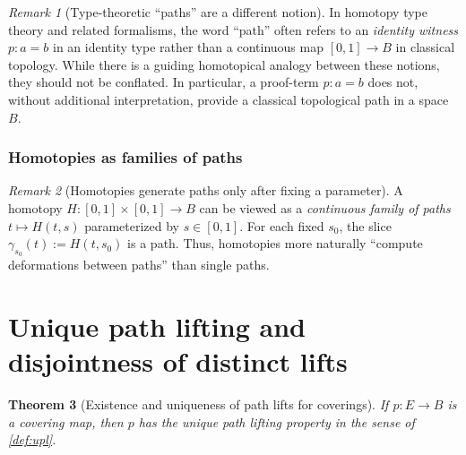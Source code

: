 \documentclass[11pt,a4paper]{article}
\newtheorem{theorem}{Theorem}[section]
\theoremstyle{definition}
\theoremstyle{remark}
\newtheorem{remark}[theorem]{Remark}
\begin{document}
\begin{remark}[Type-theoretic ``paths'' are a different notion]
\label{rem:tt-paths}
In homotopy type theory and related formalisms, the word ``path'' often refers to an \emph{identity witness} \(p:a=b\) in an identity type rather than a continuous map \([0,1]\to B\) in classical topology. While there is a guiding homotopical analogy between these notions, they should not be conflated. In particular, a proof-term \(p:a=b\) does not, without additional interpretation, provide a classical topological path in a space \(B\).
\end{remark}

\subsubsection{Homotopies as families of paths}
\label{sec:homotopies-as-families}

\begin{remark}[Homotopies generate paths only after fixing a parameter]
\label{rem:homotopy-slice}
A homotopy \(H:[0,1]\times[0,1]\to B\) can be viewed as a \emph{continuous family of paths} \(t\mapsto H(t,s)\) parameterized by \(s\in[0,1]\). For each fixed \(s_0\), the slice \(\gamma_{s_0}(t):=H(t,s_0)\) is a path. Thus, homotopies more naturally ``compute deformations between paths'' than single paths.
\end{remark}

\section{Unique path lifting and disjointness of distinct lifts}
\label{sec:upl-disjoint}

\begin{theorem}[Existence and uniqueness of path lifts for coverings]
\label{thm:path-lifting}
If \(p:E\to B\) is a covering map, then \(p\) has the unique path lifting property in the sense of \cref{def:upl}.
\end{theorem}
\end{document}
